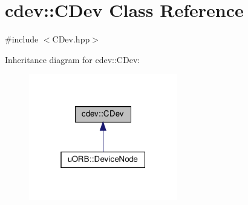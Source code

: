 \hypertarget{classcdev_1_1CDev}{}\section{cdev\+:\+:C\+Dev Class Reference}
\label{classcdev_1_1CDev}


{\ttfamily \#include $<$C\+Dev.\+hpp$>$}



Inheritance diagram for cdev\+:\+:C\+Dev\+:\nopagebreak
\begin{figure}[H]
\begin{center}
\leavevmode
\includegraphics[width=184pt]{dc/d50/classcdev_1_1CDev__inherit__graph}
\end{center}
\end{figure}
